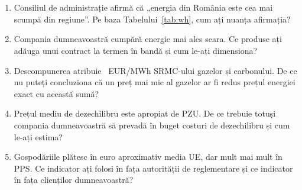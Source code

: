 \section{}
\begin{enumerate}
\item {}%
{Consiliul de administrație afirmă că „energia din România este cea mai scumpă din regiune”. Pe baza Tabelului~\ref{tab:wh}, cum ați nuanța afirmația?}
\item {}%
{Compania dumneavoastră cumpără energie mai ales seara. Ce produse ați adăuga unui contract la termen în bandă și cum le-ați dimensiona?}
\item {}%
{Descompunerea atribuie \NcSrmc\ EUR/MWh SRMC-ului gazelor și carbonului. De ce nu puteți concluziona că un preț mai mic al gazelor ar fi redus prețul energiei exact cu această sumă?}
\item {}%
{Prețul mediu de dezechilibru este apropiat de PZU. De ce trebuie totuși compania dumneavoastră să prevadă în buget costuri de dezechilibru și cum le-ați estima?}
\item {}%
{Gospodăriile plătesc în euro aproximativ media UE, dar mult mai mult în PPS. Ce indicator ați folosi în fața autorității de reglementare și ce indicator în fața clienților dumneavoastră?}
\end{enumerate}

